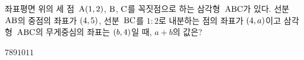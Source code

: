 좌표평면 위의 세 점~$\mathrm{A}(1{,}\mkern3mu 2)$, $\mathrm{B}$, $\mathrm{C}$를 꼭짓점으로 하는 삼각형~$\mathrm{ABC}$가 있다. 선분~$\mathrm{AB}$의 중점의 좌표가 $(4{,}\mkern3mu 5)$, 선분~$\mathrm{BC}$를 $1:2$로 내분하는 점의 좌표가 $(4{,}\mkern3mu a)$이고 삼각형~$\mathrm{ABC}$의 무게중심의 좌표는 $(b{,}\mkern3mu 4)$일 때, $a+b$의 값은?
\begin{choices32}{$7$}{$8$}{$9$}{$10$}{$11$}\end{choices32}
